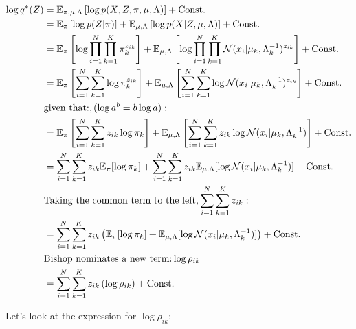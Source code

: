 \documentclass{article}
\def\C{\text{Const.}}
\begin{document}
\begin{equation}
\begin{split}
    \log q^*(Z) &= \E_{\pi,\mu,\Lambda} \left[ \log p (X,Z, \pi, \mu, \Lambda)  \right] + \C \\
    &= \E_{\pi} \left[ \log p (Z | \pi)  \right]  + \E_{\mu, \Lambda} \left[ \log p (X | Z, \mu, \Lambda)  \right] + \C \\
    &= \E_{\pi} \left[ \log \prod^N_{i=1} \prod^K_{k=1} \pi^{z_{ik}}_k  \right]  + \E_{\mu, \Lambda} \left[ \log  \prod^N_{i=1} \prod^K_{k=1} \mathcal{N}(x_i | \mu_{k}, \Lambda_{k}^{-1})^{z_{ik}}  \right] + \C \\
    &= \E_{\pi} \left[ \sum^N_{i=1} \sum^K_{k=1} \log \pi^{z_{ik}}_k  \right]  + \E_{\mu, \Lambda} \left[  \sum^N_{i=1} \sum^K_{k=1} \log \mathcal{N}(x_i | \mu_{k}, \Lambda_{k}^{-1})^{z_{ik}}  \right] + \C \\
    &\text{given that:}, ( \log a^b = b \log a):\\
    &= \E_{\pi} \left[ \sum^N_{i=1} \sum^K_{k=1} z_{ik} \log \pi_k  \right]  + \E_{\mu, \Lambda} \left[  \sum^N_{i=1} \sum^K_{k=1} z_{ik} \log \mathcal{N}(x_i | \mu_{k}, \Lambda_{k}^{-1})  \right] + \C \\
    &= \sum^N_{i=1} \sum^K_{k=1} z_{ik} \E_{\pi}  [ \log \pi_k ]  +  \sum^N_{i=1} \sum^K_{k=1} z_{ik} \E_{\mu, \Lambda} [ \log \mathcal{N}(x_i | \mu_{k}, \Lambda_{k}^{-1}) ]  + \C \\
    &\text{Taking the common term to the left}, \sum^N_{i=1} \sum^K_{k=1} z_{ik}:\\
    &= \sum^N_{i=1} \sum^K_{k=1} z_{ik} \left( \E_{\pi}  [ \log \pi_k ]  + \E_{\mu, \Lambda} [ \log \mathcal{N}(x_i | \mu_{k}, \Lambda_{k}^{-1}) ] \right) + \C \\
    &\text{Bishop nominates a new term:} \log \rho_{ik} \\
    &= \sum^N_{i=1} \sum^K_{k=1} z_{ik} \left( \log \rho_{ik} \right) + \C \\
\end{split}
\end{equation}

Let's look at the expression for $\log \rho_{ik}$:
\end{document}
